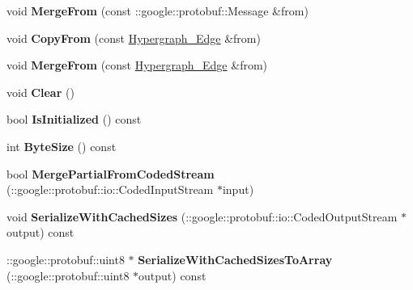\begin{DoxyCompactItemize}
\item 
\hypertarget{classHypergraph__Edge_a10b898c3321b1dc37977b452ac8e6f0e}{
void {\bfseries MergeFrom} (const ::google::protobuf::Message \&from)}
\label{classHypergraph__Edge_a10b898c3321b1dc37977b452ac8e6f0e}

\item 
\hypertarget{classHypergraph__Edge_a63ed56813c060988bc61a35ea30d216e}{
void {\bfseries CopyFrom} (const \hyperlink{classHypergraph__Edge}{Hypergraph\_\-Edge} \&from)}
\label{classHypergraph__Edge_a63ed56813c060988bc61a35ea30d216e}

\item 
\hypertarget{classHypergraph__Edge_a193be9b1c77ac3c955bedfd14581b88a}{
void {\bfseries MergeFrom} (const \hyperlink{classHypergraph__Edge}{Hypergraph\_\-Edge} \&from)}
\label{classHypergraph__Edge_a193be9b1c77ac3c955bedfd14581b88a}

\item 
\hypertarget{classHypergraph__Edge_a111b4c380a219239ea99a0803b1160b9}{
void {\bfseries Clear} ()}
\label{classHypergraph__Edge_a111b4c380a219239ea99a0803b1160b9}

\item 
\hypertarget{classHypergraph__Edge_a635fda95ae632d07889b53588d4352bc}{
bool {\bfseries IsInitialized} () const }
\label{classHypergraph__Edge_a635fda95ae632d07889b53588d4352bc}

\item 
\hypertarget{classHypergraph__Edge_a98114bd535825d90c7e28499f957c0f4}{
int {\bfseries ByteSize} () const }
\label{classHypergraph__Edge_a98114bd535825d90c7e28499f957c0f4}

\item 
\hypertarget{classHypergraph__Edge_aef6ab2097154d0ac22d50d0159f5610a}{
bool {\bfseries MergePartialFromCodedStream} (::google::protobuf::io::CodedInputStream $\ast$input)}
\label{classHypergraph__Edge_aef6ab2097154d0ac22d50d0159f5610a}

\item 
\hypertarget{classHypergraph__Edge_ac3aba45b607957f38bc9cc9eab5ef614}{
void {\bfseries SerializeWithCachedSizes} (::google::protobuf::io::CodedOutputStream $\ast$output) const }
\label{classHypergraph__Edge_ac3aba45b607957f38bc9cc9eab5ef614}

\item 
\hypertarget{classHypergraph__Edge_a3ff2b66a692e1e8cdab7b39a9f484580}{
::google::protobuf::uint8 $\ast$ {\bfseries SerializeWithCachedSizesToArray} (::google::protobuf::uint8 $\ast$output) const }
\label{classHypergraph__Edge_a3ff2b66a692e1e8cdab7b39a9f484580}


\end{DoxyCompactItemize}
